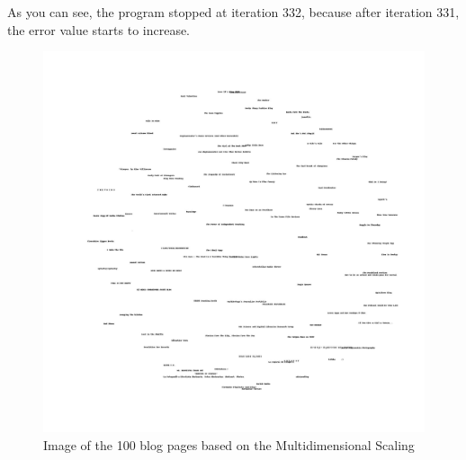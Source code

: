 \documentclass[12pt]{article}
\begin{document}
As you can see, the program stopped at iteration 332, because after iteration 331, the error value starts to increase.



\begin{figure}[h]
\centering
\includegraphics[width=6.5in]{MDS.jpg}
\caption{Image of the 100 blog pages based on the Multidimensional Scaling}
\end{figure}
\pagebreak
\end{document}
